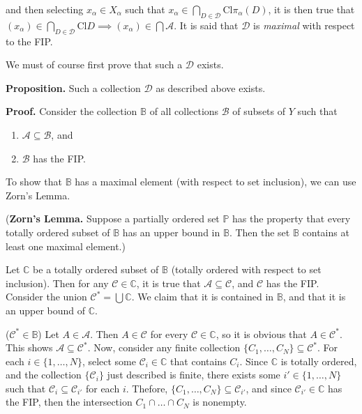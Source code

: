 \documentclass[12pt]{article}
\begin{document}
and then selecting $x_\alpha \in X_\alpha$ such that $x_\alpha \in \bigcap_{D \in \mathcal{D}} \text{Cl} \pi_\alpha (D)$, it is then true that $(x_\alpha) \in \bigcap_{D \in \mathcal{D}} \text{Cl} D \implies (x_\alpha) \in \bigcap \mathcal{A}$. It is said that $\mathcal{D}$ is \emph{maximal} with respect to the FIP.

\vspace{1 \baselineskip}

We must of course first prove that such a $\mathcal{D}$ exists.

\textbf{Proposition. } Such a collection $\mathcal{D}$ as described above exists.

\textbf{Proof. } Consider the collection $\mathbb{B}$ of all collections $\mathcal{B}$ of subsets of $Y$ such that

\begin{enumerate}
\item $\mathcal{A} \subseteq \mathcal{B}$, and
\item $\mathcal{B}$ has the FIP.
\end{enumerate}

To show that $\mathbb{B}$ has a maximal element (with respect to set inclusion), we can use Zorn's Lemma.

(\textbf{Zorn's Lemma. } Suppose a partially ordered set $\mathbb{P}$ has the property that every totally ordered subset of $\mathbb{B}$ has an upper bound in $\mathbb{B}$. Then the set $\mathbb{B}$ contains at least one maximal element.)

Let $\mathbb{C}$ be a totally ordered subset of $\mathbb{B}$ (totally ordered with respect to set inclusion). Then for any $\mathcal{C} \in \mathbb{C}$, it is true that $\mathcal{A} \subseteq \mathcal{C}$, and $\mathcal{C}$ has the FIP. Consider the union $\mathcal{C}^* = \bigcup \mathbb{C}$. We claim that it is contained in $\mathbb{B}$, and that it is an upper bound of $\mathbb{C}$.

($\mathcal{C}^* \in \mathbb{B}$) Let $A \in \mathcal{A}$. Then $A \in \mathcal{C} $ for every $\mathcal{C} \in \mathbb{C}$, so it is obvious that $A \in \mathcal{C}^*$. This shows $\mathcal{A} \subseteq \mathcal{C}^*$. Now, consider any finite collection $\{ C_1, \dots, C_N \} \subseteq \mathcal{C}^*$. For each $i \in \{ 1, \dots, N \}$, select some $\mathcal{C}_i \in \mathbb{C}$ that contains $C_i$. Since $\mathbb{C}$ is totally ordered, and the collection $\{ \mathcal{C}_i \}$ just described is finite, there exists some $i' \in \{ 1, \dots, N \}$ such that $\mathcal{C}_i \subseteq \mathcal{C}_{i'}$ for each $i$. Thefore, $\{ C_1, \dots, C_N \} \subseteq \mathcal{C}_{i'}$, and since $\mathcal{C}_{i'} \in \mathbb{C}$ has the FIP, then the intersection $C_1 \cap \dots \cap C_N$ is nonempty.
\end{document}
